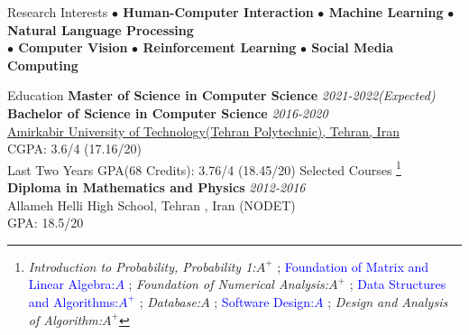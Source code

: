 \documentclass{resume} %
\begin{document}
	
	\begin{rSection}{Research Interests}
			\textbf{ $\bullet$ Human-Computer Interaction}\hspace*{16pt}
			\textbf{ $\bullet$ Machine Learning}\hspace*{16pt}
			\textbf{$\bullet$ Natural Language Processing} \hspace*{16pt}\\
			\textbf{ $\bullet$ Computer Vision}\hspace*{16pt}
			\textbf{ $\bullet$ Reinforcement Learning}\hspace*{16pt}
			\textbf{ $\bullet$ Social Media Computing}	\hspace*{16pt}	


	\end{rSection}
	
	
	\begin{rSection}{Education}
		{\bf Master of Science in Computer Science} \hfill {\em 2021-2022(Expected)} \\ 
		
		{\bf Bachelor of Science in Computer Science} \hfill {\em 2016-2020} \\ 
		\href{https://www.topuniversities.com/universities/amirkabir-university-technology}{\textcolor{coolblack}{Amirkabir University of Technology(Tehran Polytechnic), Tehran, Iran} }\\
		CGPA: 3.6/4 (17.16/20)\\
		Last Two Years GPA(68 Credits): 3.76/4 (18.45/20) \hspace{20pt}		Selected Courses
		\footnote{\textit{Introduction to Probability, Probability 1:$A^{+}$ }; \textcolor{blue}{Foundation of Matrix and Linear Algebra:$A$ }; \textit{Foundation of Numerical Analysis:$A^{+}$ };  \textcolor{blue}{Data Structures and Algorithms:$A^{+}$ }; \textit{Database:$A$ }; \textcolor{blue}{Software Design:$A$} ; \textit{Design and Analysis of Algorithm:$A^{+}$}} \\
		{\bf Diploma in Mathematics and Physics} \hfill {\em 2012-2016}\\ 
		Allameh Helli High School, Tehran , Iran (NODET)\\
		GPA: 18.5/20
	\end{rSection}
	
\end{document}
